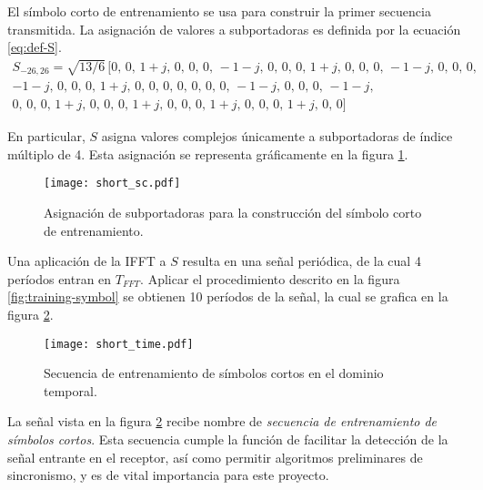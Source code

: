 El símbolo corto de entrenamiento se usa para construir la primer secuencia transmitida. La asignación de valores a subportadoras es definida por la ecuación \ref{eq:def-S}.\\
\begin{equation}\label{eq:def-S}
    \begin{aligned}
    S_{-26,26} = \sqrt{13/6}\, 
    [0 ,\,  0   ,\, 1+j ,\,  0   ,\, 0 ,\,  0   ,\, -1-j ,\,  0   ,\, 0 ,\, 0   ,\, 1+j ,\, 0   ,\, 0 ,\, 
     0 ,\, -1-j ,\, 0   ,\,  0   ,\, 0 ,\\ -1-j ,\,  0   ,\,  0   ,\, 0 ,\, 1+j ,\, 0   ,\, 0   ,\, 0 ,\, 0 ,\,
     0 ,\,  0   ,\, 0   ,\, -1-j ,\, 0 ,\,  0   ,\,  0   ,\, -1-j ,\\ 0 ,\, 0   ,\, 0   ,\, 1+j ,\, 0 ,\, 
     0 ,\,  0   ,\, 1+j ,\,  0   ,\, 0 ,\,  0   ,\,  1+j ,\,  0   ,\, 0 ,\, 0   ,\, 1+j ,\, 0   ,\, 0]
    \end{aligned}
\end{equation}
    
En particular, $S$ asigna valores complejos únicamente a subportadoras de índice múltiplo de 4. Esta asignación se representa gráficamente en la figura \ref{fig:short-sc}.\\
\begin{figure}[ht]
    \centering{}\texttt{[image: short\_sc.pdf]}
    \caption{Asignación de subportadoras para la construcción del símbolo corto de entrenamiento.\label{fig:short-sc}}  
\end{figure}

Una aplicación de la IFFT a $S$ resulta en una señal periódica, de la cual 4 períodos entran en $T_{FFT}$. Aplicar el procedimiento descrito en la figura \ref{fig:training-symbol} se obtienen 10 períodos de la señal, la cual se grafica en la figura \ref{fig:short-time}.\\ 
\begin{figure}[ht]
    \centering{}\texttt{[image: short\_time.pdf]}
    \caption{Secuencia de entrenamiento de símbolos cortos en el dominio temporal.\label{fig:short-time}}  
\end{figure}

La señal vista en la figura \ref{fig:short-time} recibe nombre de \textit{secuencia de entrenamiento de símbolos cortos}. Esta secuencia cumple la función de facilitar la detección de la señal entrante en el receptor, así como permitir algoritmos preliminares de sincronismo, y es de vital importancia para este proyecto.


